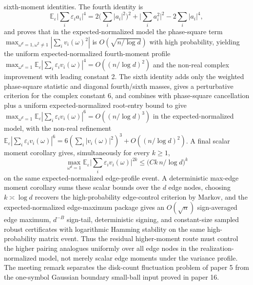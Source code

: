 \documentclass[11pt]{article}
\begin{document}
sixth-moment identities.  The fourth identity is
\[
\mathbb E_\varepsilon\Big|\sum_i\varepsilon_i a_i\Big|^4
=2\Big(\sum_i|a_i|^2\Big)^2+\Big|\sum_i a_i^2\Big|^2
-2\sum_i|a_i|^4,
\]
and proves that in the expected-normalized model the phase-square term
\(\max_{\omega^d=1,\omega^2\ne1}|\sum_i v_i(\omega)^2|\) is
\(O(\sqrt{n/\log d})\) with high probability, yielding the uniform
expected-normalized fourth-moment profile
\(\max_{\omega^d=1}\mathbb E_\varepsilon|\sum_i\varepsilon_i v_i(\omega)|^4
 =O((n/\log d)^2)\) and the non-real complex improvement with leading constant
2.  The sixth identity adds only the weighted phase-square statistic and
diagonal fourth/sixth masses, gives a perturbative criterion for the complex
constant \(6\), and combines with phase-square cancellation plus a uniform
expected-normalized root-entry bound to give
\(\max_{\omega^d=1}\mathbb E_\varepsilon|\sum_i\varepsilon_i v_i(\omega)|^6
=O((n/\log d)^3)\) in the expected-normalized model, with the non-real
refinement
\(\mathbb E_\varepsilon|\sum_i\varepsilon_i v_i(\omega)|^6
=6(\sum_i|v_i(\omega)|^2)^3+O((n/\log d)^2)\).  A final scalar moment corollary
gives, simultaneously for every \(k\ge1\),
\[
\max_{\omega^d=1}\mathbb E_\varepsilon
  \Big|\sum_i\varepsilon_i v_i(\omega)\Big|^{2k}
\le \big(Ck\,n/\log d\big)^k
\]
on the same expected-normalized edge-profile event.  A deterministic max-edge
moment corollary sums these scalar bounds over the \(d\) edge nodes, choosing
\(k\asymp\log d\) recovers the high-probability edge-control criterion by Markov,
and the expected-normalized edge-maximum package gives an \(O(\sqrt n)\)
sign-averaged edge maximum, \(d^{-B}\) sign-tail, deterministic signing, and
constant-size sampled robust certificates with logarithmic Hamming stability on
the same high-probability matrix event.  Thus the residual higher-moment route must control the higher
pairing analogues uniformly over all edge nodes in the realization-normalized
model, not merely scalar edge moments under the variance profile.  The meeting
remark separates the
disk-count fluctuation problem of paper 5 from the one-symbol Gaussian boundary
small-ball input proved in paper 16.
\end{document}
